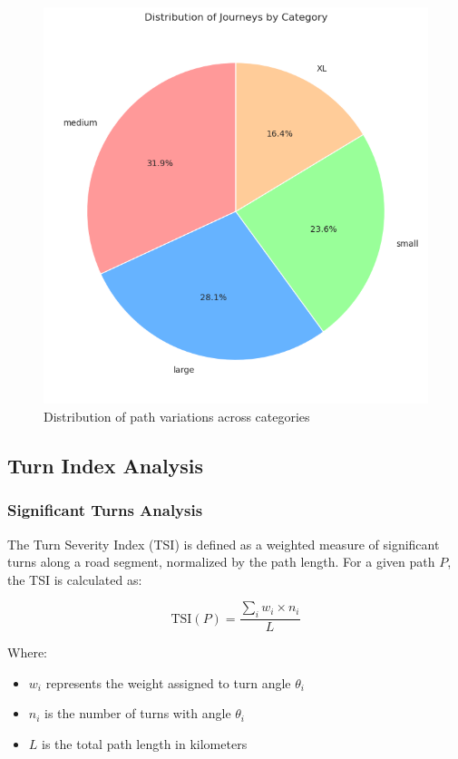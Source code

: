 \documentclass[sigplan,screen]{acmart}
\begin{document}
\begin{figure}[h]
    \centering
    \includegraphics[width=0.8\linewidth]{images/path_dist.png}
    \caption{Distribution of path variations across categories}
    \label{fig:path_dist}
\end{figure}

\subsection{Turn Index Analysis}

\subsubsection{Significant Turns Analysis}
The Turn Severity Index (TSI) is defined as a weighted measure of significant turns along a road segment, normalized by the path length. For a given path $P$, the TSI is calculated as:

\begin{equation}
    \text{TSI}(P) = \frac{\sum_{i} w_i \times n_i}{L}
\end{equation}

Where:
\begin{itemize}
    \item $w_i$ represents the weight assigned to turn angle $\theta_i$
    \item $n_i$ is the number of turns with angle $\theta_i$
    \item $L$ is the total path length in kilometers
\end{itemize}
\end{document}
